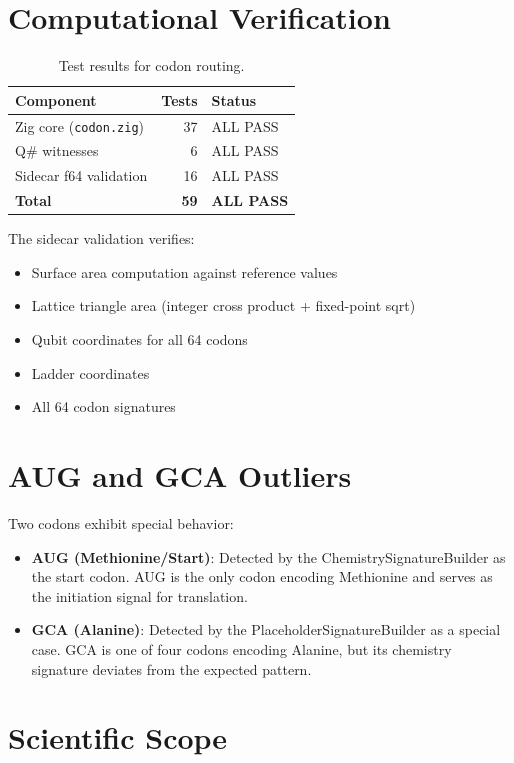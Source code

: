 \documentclass[11pt]{article}
\begin{document}
\section{Computational Verification}

\begin{table}[ht]
\centering
\caption{Test results for codon routing.}
\label{tab:tests}
\begin{tabular}{lrl}
\toprule
Component & Tests & Status \\
\midrule
Zig core (\texttt{codon.zig}) & 37 & ALL PASS \\
Q\# witnesses & 6 & ALL PASS \\
Sidecar f64 validation & 16 & ALL PASS \\
\midrule
\textbf{Total} & \textbf{59} & \textbf{ALL PASS} \\
\bottomrule
\end{tabular}
\end{table}

The sidecar validation verifies:
\begin{itemize}
\item Surface area computation against reference values
\item Lattice triangle area (integer cross product + fixed-point sqrt)
\item Qubit coordinates for all 64 codons
\item Ladder coordinates
\item All 64 codon signatures
\end{itemize}

\section{AUG and GCA Outliers}

Two codons exhibit special behavior:

\begin{itemize}
\item \textbf{AUG (Methionine/Start)}: Detected by the ChemistrySignatureBuilder as the start codon. AUG is the only codon encoding Methionine and serves as the initiation signal for translation.
\item \textbf{GCA (Alanine)}: Detected by the PlaceholderSignatureBuilder as a special case. GCA is one of four codons encoding Alanine, but its chemistry signature deviates from the expected pattern.
\end{itemize}

\section{Scientific Scope}
\end{document}
